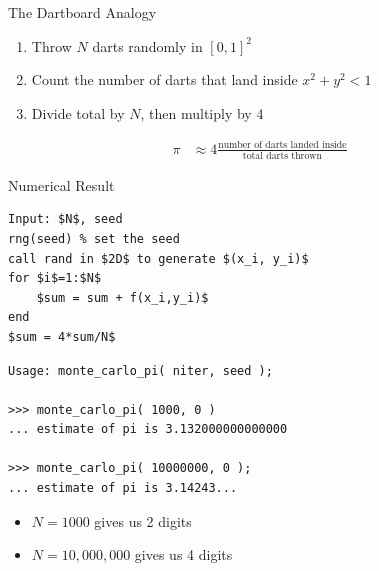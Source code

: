 \documentclass[10pt]{beamer}
\begin{document}
\begin{frame}{The Dartboard Analogy}

\begin{enumerate}
    \item Throw $N$ darts randomly in $[0,1]^2$
    \item Count the number of darts that land inside $x^2+y^2 < 1$
    \item Divide total by $N$, then multiply by 4
\end{enumerate}
\begin{align*}
    \pi &\approx 4 \frac{\text{number of darts landed inside}}{\text{total darts thrown}}
\end{align*}
\begin{center}
\end{center}
\end{frame}

\begin{frame}[fragile]{Numerical Result}
\begin{lstlisting}[mathescape]
Input: $N$, seed
rng(seed) % set the seed
call rand in $2D$ to generate $(x_i, y_i)$
for $i$=1:$N$
    $sum = sum + f(x_i,y_i)$
end
$sum = 4*sum/N$
\end{lstlisting}

\begin{lstlisting}[mathescape]
Usage: monte_carlo_pi( niter, seed );

>>> monte_carlo_pi( 1000, 0 )
... estimate of pi is 3.132000000000000

>>> monte_carlo_pi( 10000000, 0 );
... estimate of pi is 3.14243...
\end{lstlisting}

\begin{itemize}
   \item $N=1000$ gives us 2 digits 
   \item $N=10,000,000$ gives us 4 digits
\end{itemize}

\end{frame}
\end{document}
